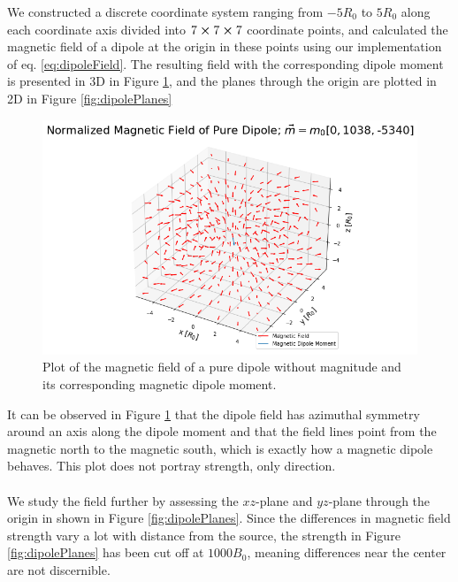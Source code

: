 We constructed a discrete coordinate system ranging from $-5R_0$ to $5R_0$ along each coordinate axis divided into $7\cross 7\cross 7$ coordinate points, and calculated the magnetic field of a dipole at the origin in these points using our implementation of eq. \ref{eq:dipoleField}. The resulting field with the corresponding dipole moment is presented in 3D in Figure \ref{fig:dipoleField}, and the planes through the origin are plotted in 2D in Figure \ref{fig:dipolePlanes}\\

\begin{figure}[ht]
    \centering
    \includegraphics[scale=.4]{Images/dipoleField.png}
    \caption{Plot of the magnetic field of a pure dipole without magnitude and its corresponding magnetic dipole moment.}
    \label{fig:dipoleField}
\end{figure}

\noindent It can be observed in Figure \ref{fig:dipoleField} that the dipole field has azimuthal symmetry around an axis along the dipole moment and that the field lines point from the magnetic north to the magnetic south, which is exactly how a magnetic dipole behaves. This plot does not portray strength, only direction.\\
\\
We study the field further by assessing the $xz$-plane and $yz$-plane through the origin in shown in Figure \ref{fig:dipolePlanes}. Since the differences in magnetic field strength vary a lot with distance from the source, the strength in Figure \ref{fig:dipolePlanes} has been cut off at $1000B_0$, meaning differences near the center are not discernible.\\

